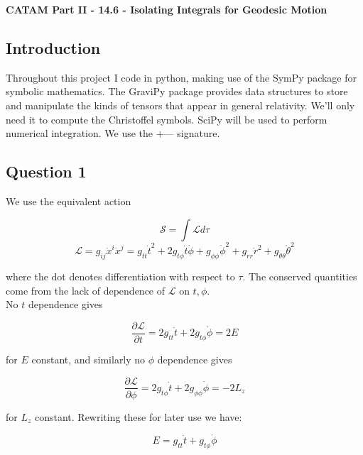 \documentclass[10pt,a4paper]{report}
\begin{document}
\textbf{CATAM Part II - 14.6 - Isolating Integrals for Geodesic Motion}
\thispagestyle{empty}

\newpage

\subsection*{Introduction}

Throughout this project I code in python, making use of the SymPy package for symbolic mathematics. The GraviPy package provides data structures to store and manipulate the kinds of tensors that appear in general relativity. We'll only need it to compute the Christoffel symbols. SciPy will be used to perform numerical integration. We use the +--- signature. 
\subsection*{Question 1}

We use the equivalent action 

\begin{equation*}
\mathcal{S}=\int \mathcal{L} d\tau
\end{equation*}
\begin{equation*}
\mathcal{L}=g_{ij}\dot{x}^i\dot{x}^j = g_{tt}\dot{t}^2 + 2g_{t\phi}\dot{t}\dot{\phi}+g_{\phi\phi}\dot{\phi}^2+g_{rr}\dot{r}^2+g_{\theta\theta}\dot{\theta}^2
\end{equation*} 

where the dot denotes differentiation with respect to $\tau$. The conserved quantities come from the lack of dependence of $\mathcal{L}$ on $t, \phi$.\\

No $t$ dependence gives

\begin{equation}
\frac{\partial \mathcal{L}}{\partial t} = 2g_{tt}\dot{t} + 2g_{t\phi}\dot{\phi} = 2E
\end{equation}

for $E$ constant, and similarly no $\phi$ dependence gives 

\begin{equation}
\frac{\partial \mathcal{L}}{\partial \phi} = 2g_{t\phi}\dot{t}+2g_{\phi\phi}\dot{\phi} = -2L_z
\end{equation}

for $L_z$ constant. Rewriting these for later use we have: 

\begin{equation}
E = g_{tt}\dot{t} + g_{t\phi}\dot{\phi}
\label{Edef}
\end{equation}
\end{document}
